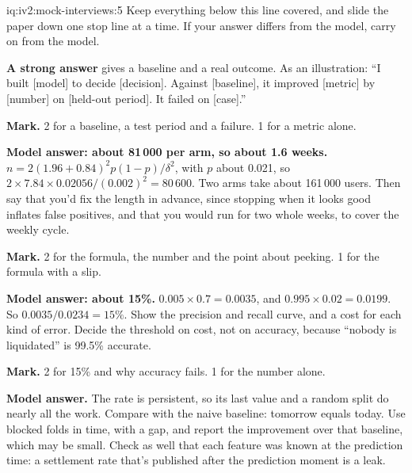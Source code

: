 \begin{solution}{iq:iv2:mock-interviews:5}
Keep everything below this line covered, and slide the paper down one stop line at a time. If your answer differs from the model, carry on from the model.

\ivstop
\textbf{A strong answer} gives a baseline and a real outcome. As an illustration: ``I built [model] to decide [decision]. Against [baseline], it improved [metric] by [number] on [held-out period]. It failed on [case].''

\textbf{Mark.} 2 for a baseline, a test period and a failure. 1 for a metric alone.

\ivstop
\textbf{Model answer: about 81\,000 per arm, so about 1.6 weeks.} $n = 2(1.96 + 0.84)^2 p(1 - p)/\delta^2$, with $p$ about 0.021, so $2 \times 7.84 \times 0.02056/(0.002)^2 = 80\,600$. Two arms take about 161\,000 users. Then say that you'd fix the length in advance, since stopping when it looks good inflates false positives, and that you would run for two whole weeks, to cover the weekly cycle.

\textbf{Mark.} 2 for the formula, the number and the point about peeking. 1 for the formula with a slip.

\ivstop
\textbf{Model answer: about 15\%.} $0.005 \times 0.7 = 0.0035$, and $0.995 \times 0.02 = 0.0199$. So $0.0035/0.0234 = 15\%$. Show the precision and recall curve, and a cost for each kind of error. Decide the threshold on cost, not on accuracy, because ``nobody is liquidated'' is 99.5\% accurate.

\textbf{Mark.} 2 for 15\% and why accuracy fails. 1 for the number alone.

\ivstop
\textbf{Model answer.} The rate is persistent, so its last value and a random split do nearly all the work. Compare with the naive baseline: tomorrow equals today. Use blocked folds in time, with a gap, and report the improvement over that baseline, which may be small. Check as well that each feature was known at the prediction time: a settlement rate that's published after the prediction moment is a leak.


\end{solution}
